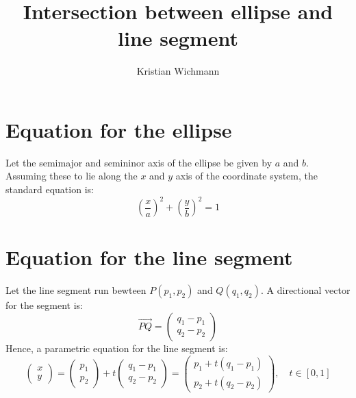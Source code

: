 \documentclass[12pt, a4paper]{article}
\title{Intersection between ellipse and line segment}
\author{Kristian Wichmann}
\numberwithin{equation}{section}
\begin{document}
\maketitle

\section{Equation for the ellipse}
Let the semimajor and semininor axis of the ellipse be given by $a$ and $b$. Assuming these to lie along the $x$ and $y$ axis of the coordinate system, the standard equation is:
\begin{equation}
\label{ellipse_equation}
\left(\frac{x}{a}\right)^2+\left(\frac{y}{b}\right)^2=1
\end{equation}

\section{Equation for the line segment}
Let the line segment run bewteen $P(p_1,p_2)$ and $Q(q_1,q_2)$. A directional vector for the segment is:
\begin{equation}
\label{line_equation}
\vec{PQ}=
\begin{pmatrix}
q_1-p_1 \\
q_2-p_2
\end{pmatrix}
\end{equation}
Hence, a parametric equation for the line segment is:
\begin{equation}
\begin{pmatrix}
x \\
y
\end{pmatrix}
=
\begin{pmatrix}
p_1 \\
p_2
\end{pmatrix}
+t
\begin{pmatrix}
q_1-p_1 \\
q_2-p_2
\end{pmatrix}
=
\begin{pmatrix}
p_1 + t(q_1-p_1) \\
p_2 + t(q_2-p_2)
\end{pmatrix}
,\quad t\in[0,1]
\end{equation}
\end{document}

